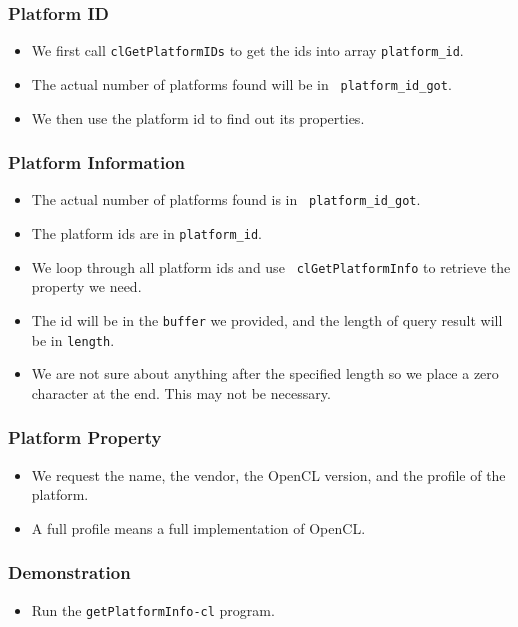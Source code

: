 \documentclass{beamer}
\begin{document}
\begin{frame}
  \frametitle{Platform ID}
  \begin{itemize}
  \item We first call {\tt clGetPlatformIDs} to get the ids into array
    {\tt platform\_id}.
  \item The actual number of platforms found will be in {\tt
    platform\_id\_got}.
  \item We then use the platform id to find out its properties.
  \end{itemize}
\end{frame}


\begin{frame}
  \frametitle{Platform Information}
  \begin{itemize}
  \item The actual number of platforms found is in {\tt
    platform\_id\_got}.
  \item The platform ids are in {\tt platform\_id}.
  \item We loop through all platform ids and use {\tt
    clGetPlatformInfo} to retrieve the property we need.
  \item The id will be in the {\tt buffer} we provided, and the length
    of query result will be in {\tt length}.
  \item We are not sure about anything after the specified length so
    we place a zero character at the end.  This may not be necessary.
  \end{itemize}
\end{frame}

\begin{frame}
  \frametitle{Platform Property}
  \begin{itemize}
  \item We request the name, the vendor, the OpenCL version, and the
    profile of the platform.
  \item A full profile means a full implementation of OpenCL.
  \end{itemize}
\end{frame}


\begin{frame}
  \frametitle{Demonstration}
  \begin{itemize}
  \item Run the {\tt getPlatformInfo-cl} program.
  \end{itemize}
\end{frame}
\end{document}
